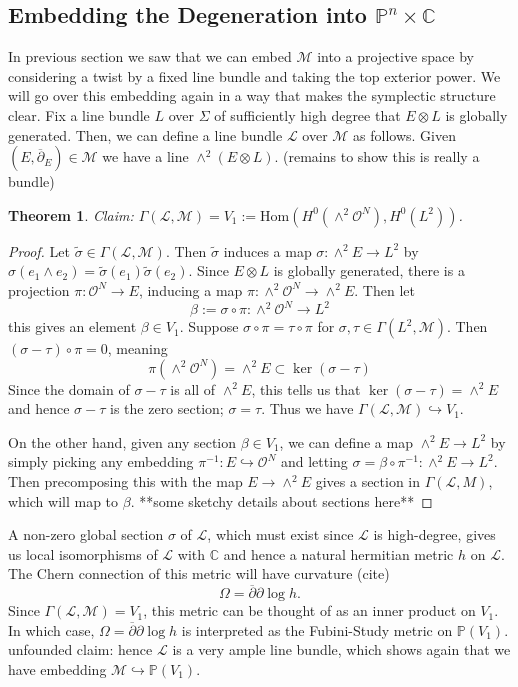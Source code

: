 \documentclass[]{article}
\newtheorem{theorem}{Theorem}
\newcommand{\PP}{\mathbb{P}}
\newcommand{\C}{\mathbb{C}}
\newcommand{\Hom}{\text{Hom}}
\newcommand{\OO}{\mathcal{O}}
\newcommand{\LL}{\mathcal{L}}
\newcommand{\MM}{\mathcal{M}}
\newcommand{\dbar}{\overline{\partial}}
\begin{document}
	\subsection{Embedding the Degeneration into $\mathbb{P}^n\times \C$}
	In previous section we saw that we can embed $\MM$ into a projective space by considering a twist by a fixed line bundle and taking the top exterior power. We will go over this embedding again in a way that makes the symplectic structure clear. Fix a line bundle $L$ over $\Sigma$ of sufficiently high degree that $E\otimes L$ is globally generated. Then, we can define a line bundle $\LL$ over $\MM$ as follows. Given $(E,\dbar_E)\in \MM$ we have a line $\wedge^2 (E\otimes L)$. (remains to show this is really a bundle)
	
	\begin{theorem}
		Claim: $\Gamma(\LL, \MM) = V_1 := \Hom(H^0(\wedge^2 \OO^N), H^0(L^2))$.
	\end{theorem}
	\begin{proof}
		Let $\tilde{\sigma} \in \Gamma(\LL, \MM)$. Then $\tilde{\sigma}$ induces a map $\sigma:\wedge^2 E \to L^2$ by $\sigma(e_1\wedge e_2) = \tilde{\sigma}(e_1)\tilde{\sigma}(e_2)$. Since $E\otimes L$ is globally generated, there is a projection $\pi:\OO^N \to E$, inducing a map $\pi:\wedge^2 \OO^N \to \wedge^2 E$. Then let
		\begin{equation}
			\beta := \sigma\circ \pi: \wedge^2 \OO^N \to L^2
		\end{equation}
		this gives an element $\beta \in V_1$. Suppose $\sigma \circ \pi = \tau \circ \pi$ for $\sigma,\tau \in \Gamma(L^2, \MM)$. Then $(\sigma - \tau) \circ \pi = 0$, meaning 
		\begin{equation}
		\pi(\wedge^2 \OO^N) = \wedge^2 E \subset \ker(\sigma-\tau)
		\end{equation}
		Since the domain of $\sigma-\tau$ is all of $\wedge^2 E$, this tells us that $\ker(\sigma-\tau) = \wedge^2 E$ and hence $\sigma - \tau$ is the zero section; $\sigma = \tau$. Thus we have $\Gamma(\LL, \MM) \hookrightarrow V_1$.
		
		On the other hand, given any section $\beta \in V_1$, we can define a map $\wedge^2 E \to L^2$ by simply picking any embedding $\pi^{-1}:E\hookrightarrow \OO^N$ and letting $\sigma = \beta\circ \pi^{-1}:\wedge^2 E \to L^2$. Then precomposing this with the map $E \to \wedge^2 E$ gives a section in $\Gamma(\LL, M)$, which will map to $\beta$.  
		**some sketchy details about sections here**
	\end{proof}
	A non-zero global section $\sigma$ of $\LL$, which must exist since $\LL$ is high-degree, gives us local isomorphisms of $\LL$ with $\C$ and hence a natural hermitian metric $h$ on $\LL$. The Chern connection of this metric will have curvature (cite)
	\begin{equation}
		\Omega = \dbar\partial \log h.
	\end{equation}
	Since $\Gamma(\LL,\MM) = V_1$, this metric can be thought of as an inner product on $V_1$. In which case, $\Omega =\dbar\partial \log h$ is interpreted as the Fubini-Study metric on $\PP(V_1)$. unfounded claim: hence $\LL$ is a very ample line bundle, which shows again that we have embedding $\MM \hookrightarrow \PP(V_1)$.
	
\end{document}
